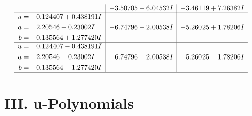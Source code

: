 \documentclass[1p]{elsarticle_modified}
\theoremstyle{definition}
\begin{document}
$$\begin{array}{c|c|c}
 & -3.50705 - 6.04532 I & -3.46119 + 7.26382 I \\ \hline\begin{aligned}
u &= \phantom{-}0.124407 + 0.438191 I \\
a &= \phantom{-}2.20546 + 0.23002 I \\
b &= \phantom{-}0.135564 + 1.277420 I\end{aligned}
 & -6.74796 - 2.00538 I & -5.26025 + 1.78206 I \\ \hline\begin{aligned}
u &= \phantom{-}0.124407 - 0.438191 I \\
a &= \phantom{-}2.20546 - 0.23002 I \\
b &= \phantom{-}0.135564 - 1.277420 I\end{aligned}
 & -6.74796 + 2.00538 I & -5.26025 - 1.78206 I\\
 \hline 
 \end{array}$$\newpage
\newpage\renewcommand{\arraystretch}{1}
\centering \section*{ III. u-Polynomials}
\end{document}
